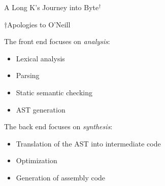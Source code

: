 \documentclass{plt}
\begin{document}
\begin{frame}{A Long K's Journey into Byte$^\dagger$}

\parskip=0pt
\begin{center}





\end{center}

{\footnotesize $\dagger$Apologies to O'Neill}

\end{frame}

\begin{frame}

The front end focuses on \emph{analysis}:

\begin{itemize}
\item Lexical analysis

\item Parsing

\item Static semantic checking

\item AST generation
\end{itemize}

The back end focuses on \emph{synthesis}:

\begin{itemize}
\item Translation of the AST into intermediate code

\item Optimization

\item Generation of assembly code
\end{itemize}

\end{frame}
\end{document}
